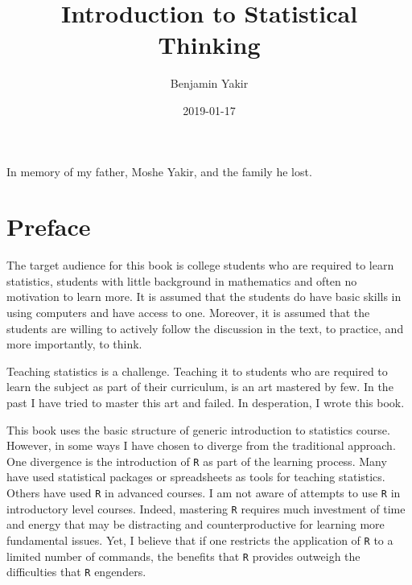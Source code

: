 \documentclass[]{krantz}
\title{Introduction to Statistical Thinking}
\author{Benjamin Yakir}
\date{2019-01-17}
\theoremstyle{definition}
\theoremstyle{definition}
\theoremstyle{definition}
\theoremstyle{remark}
\begin{document}
\maketitle


\thispagestyle{empty}

\begin{center}
In memory of my father, Moshe Yakir, and the family he lost.
\end{center}

\setlength{\abovedisplayskip}{-5pt}
\setlength{\abovedisplayshortskip}{-5pt}

{
\hypersetup{linkcolor=}
\setcounter{tocdepth}{2}
\tableofcontents
}
\hypertarget{preface}{%
\chapter*{Preface}\label{preface}}


The target audience for this book is college students who are required
to learn statistics, students with little background in mathematics and
often no motivation to learn more. It is assumed that the students do
have basic skills in using computers and have access to one. Moreover,
it is assumed that the students are willing to actively follow the
discussion in the text, to practice, and more importantly, to think.

Teaching statistics is a challenge. Teaching it to students who are
required to learn the subject as part of their curriculum, is an art
mastered by few. In the past I have tried to master this art and failed.
In desperation, I wrote this book.

This book uses the basic structure of generic introduction to statistics
course. However, in some ways I have chosen to diverge from the
traditional approach. One divergence is the introduction of \texttt{R} as part
of the learning process. Many have used statistical packages or
spreadsheets as tools for teaching statistics. Others have used \texttt{R} in
advanced courses. I am not aware of attempts to use \texttt{R} in introductory
level courses. Indeed, mastering \texttt{R} requires much investment of time
and energy that may be distracting and counterproductive for learning
more fundamental issues. Yet, I believe that if one restricts the
application of \texttt{R} to a limited number of commands, the benefits that
\texttt{R} provides outweigh the difficulties that \texttt{R} engenders.
\end{document}
